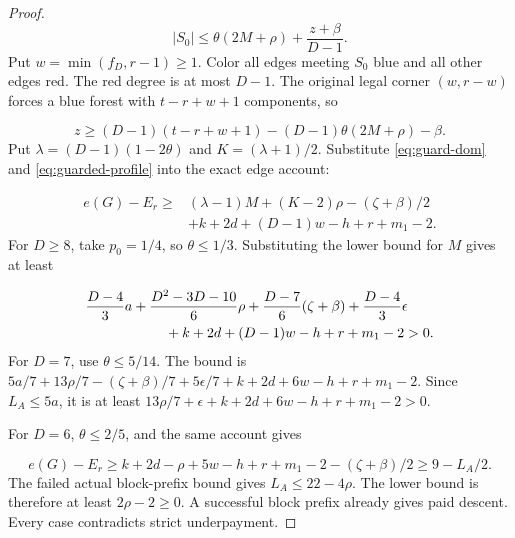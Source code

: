\documentclass[11pt,a4paper]{article}
\theoremstyle{definition}
\begin{document}
\begin{proof}
\[
 |S_0|\le\theta(2M+\rho)+\frac{z+\beta}{D-1}.
\]
Put $w=\min(f_D,r-1)\ge1$.
Color all edges meeting $S_0$ blue and all other edges red.
The red degree is at most $D-1$.
The original legal corner $(w,r-w)$ forces a blue forest with $t-r+w+1$ components, so

\begin{equation}\label{eq:guard-dom}
 z\ge(D-1)(t-r+w+1)-(D-1)\theta(2M+\rho)-\beta.
\end{equation}
Put $\lambda=(D-1)(1-2\theta)$ and $K=(\lambda+1)/2$.
Substitute \eqref{eq:guard-dom} and \eqref{eq:guarded-profile} into the exact edge account:

\[
\begin{aligned}
 e(G)-E_r\ge{}&(\lambda-1)M+(K-2)\rho-(\zeta+\beta)/2\\
 &+k+2d+(D-1)w-h+r+m_1-2.
\end{aligned}
\]
For $D\ge8$, take $p_0=1/4$, so $\theta\le1/3$.
Substituting the lower bound for $M$ gives at least

\[
\begin{aligned}
&\frac{D-4}{3}a+\frac{D^2-3D-10}{6}\rho
+\frac{D-7}{6}(\zeta+\beta)+\frac{D-4}{3}\epsilon\\
&\hspace{20mm}+k+2d+(D-1)w-h+r+m_1-2>0.
\end{aligned}
\]
For $D=7$, use $\theta\le5/14$.
The bound is
$5a/7+13\rho/7-(\zeta+\beta)/7+5\epsilon/7
+k+2d+6w-h+r+m_1-2$.
Since $L_A\le5a$, it is at least
$13\rho/7+\epsilon+k+2d+6w-h+r+m_1-2>0$.

For $D=6$, $\theta\le2/5$, and the same account gives

\[
 e(G)-E_r\ge
 k+2d-\rho+5w-h+r+m_1-2-(\zeta+\beta)/2
 \ge9-L_A/2.
\]
The failed actual block-prefix bound gives $L_A\le22-4\rho$.
The lower bound is therefore at least $2\rho-2\ge0$.
A successful block prefix already gives paid descent.
Every case contradicts strict underpayment.
\end{proof}
\end{document}
